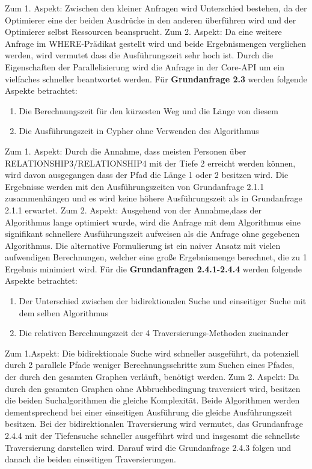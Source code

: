 Zum 1. Aspekt: Zwischen den kleiner Anfragen wird Unterschied bestehen, da der Optimierer eine der beiden Ausdrücke in den anderen überführen wird und der Optimierer selbst Ressourcen beansprucht. \newline
Zum 2. Aspekt: Da eine weitere Anfrage im WHERE-Prädikat gestellt wird und beide Ergebnismengen verglichen werden, wird vermutet dass die Ausführungszeit sehr hoch ist. Durch die Eigenschaften der Parallelisierung wird die Anfrage in der Core-API um ein vielfaches schneller beantwortet werden. \newline  \newline
Für \textbf{Grundanfrage 2.3} werden folgende Aspekte betrachtet: 
\begin{enumerate}
	\item Die Berechnungszeit für den kürzesten Weg und die Länge von diesem
	\item Die Ausführungszeit in Cypher ohne Verwenden des Algorithmus
\end{enumerate}
Zum 1. Aspekt: Durch die Annahme, dass meisten Personen über RELATIONSHIP3/RELATIONSHIP4 mit der Tiefe 2 erreicht werden können, wird davon ausgegangen dass der Pfad die Länge 1 oder 2 besitzen  wird. Die Ergebnisse werden mit den Ausführungszeiten von Grundanfrage 2.1.1 zusammenhängen und es wird keine höhere Ausführungszeit als in Grundanfrage 2.1.1 erwartet. \newline
Zum 2. Aspekt: Ausgehend von der Annahme,dass der Algorithmus lange optimiert wurde, wird die Anfrage mit dem Algorithmus eine signifikant schnellere Ausführungszeit aufweisen als die Anfrage ohne gegebenen Algorithmus. Die alternative Formulierung ist ein naiver Ansatz mit vielen aufwendigen Berechnungen, welcher eine große Ergebnismenge berechnet, die zu 1 Ergebnis minimiert wird. \newline \newline
Für die \textbf{Grundanfragen 2.4.1-2.4.4} werden folgende Aspekte betrachtet:
\begin{enumerate}
	\item Der Unterschied zwischen der bidirektionalen Suche und einseitiger Suche mit dem selben Algorithmus
	\item Die relativen Berechnungszeit der 4 Traversierungs-Methoden zueinander
\end{enumerate}
Zum 1.Aspekt: Die bidirektionale Suche wird schneller ausgeführt, da potenziell durch 2 parallele Pfade  weniger Berechnungsschritte zum Suchen eines Pfades, der  durch den gesamten Graphen verläuft, benötigt werden. \newline 
Zum 2. Aspekt: Da durch den gesamten Graphen ohne Abbruchbedingung traversiert wird, besitzen die beiden Suchalgorithmen die gleiche Komplexität. Beide Algorithmen werden dementsprechend bei einer einseitigen Ausführung die gleiche Ausführungszeit besitzen. Bei der bidirektionalen Traversierung wird vermutet, das Grundanfrage 2.4.4 mit der Tiefensuche schneller ausgeführt wird und insgesamt die schnellste Traversierung darstellen wird. Darauf wird die Grundanfrage 2.4.3 folgen und danach die beiden einseitigen Traversierungen. 
